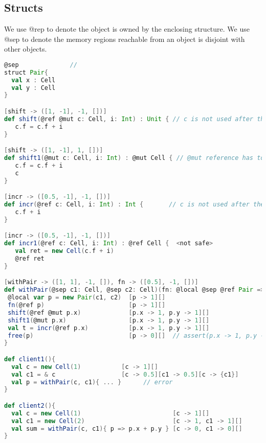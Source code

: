 \clearpage

\subsection{Structs}

\cite{haller2010capabilities}
We use @rep to denote the object is owned by the enclosing structure.
We use @sep to denote the memory regions reachable from an object is disjoint with other objects.

\begin{lstlisting}[language=Scala,basicstyle=\footnotesize\ttfamily]
@sep              //
struct Pair{
  val x : Cell
  val y : Cell
}

[shift -> ([1, -1], -1, [])]
def shift(@ref @mut c: Cell, i: Int) : Unit { // c is not used after the call to shift
   c.f = c.f + i      
}

[shift -> ([1, -1], 1, [])]
def shift1(@mut c: Cell, i: Int) : @mut Cell { // @mut reference has to be returned
   c.f = c.f + i
   c      
}

[incr -> ([0.5, -1], -1, [])]
def incr(@ref c: Cell, i: Int) : Int {       // c is not used after the call to shift
   c.f + i        
}

[incr -> ([0.5, -1], -1, [])]
def incr1(@ref c: Cell, i: Int) : @ref Cell {  <not safe>
   val ret = new Cell(c.f + i)
   @ref ret
}

[withPair -> ([1, 1], -1, []), fn -> ([0.5], -1, [])]
def withPair(@sep c1: Cell, @sep c2: Cell)(fn: @local @sep @ref Pair => Int) : Int {
 @local var p = new Pair(c1, c2)  [p -> 1][]
 fn(@ref p)                       [p -> 1][]                     
 shift(@ref @mut p.x)             [p.x -> 1, p.y -> 1][]
 shift1(@mut p.x)                 [p.x -> 1, p.y -> 1][]
 val t = incr(@ref p.x)           [p.x -> 1, p.y -> 1][]
 free(p)                          [p -> 0][]  // assert(p.x -> 1, p.y -> 1)
}

def client1(){
  val c = new Cell(1)           [c -> 1][] 
  val c1 = & c                  [c -> 0.5][c1 -> 0.5][c -> {c1}]
  val p = withPair(c, c1){ ... }      // error   
}

def client2(){
  val c = new Cell(1)                         [c -> 1][] 
  val c1 = new Cell(2)                        [c -> 1, c1 -> 1][] 
  val sum = withPair(c, c1){ p => p.x + p.y } [c -> 0, c1 -> 0][]       
}

\end{lstlisting}

